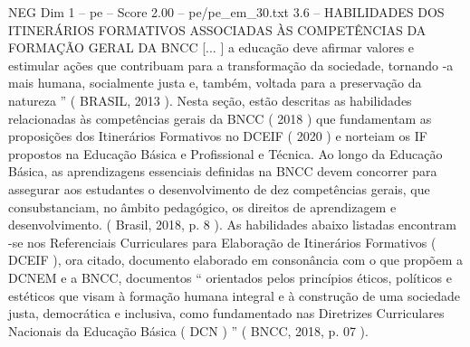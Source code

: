 \begin{textsample}{NEG Dim 1 – pe – Score 2.00 – pe/pe\_em\_30.txt}  \label{ex:f1_neg_043}
3.6 – HABILIDADES DOS ITINERÁRIOS FORMATIVOS ASSOCIADAS ÀS COMPETÊNCIAS DA FORMAÇÃO GERAL DA BNCC [... ] a educação deve afirmar valores e estimular ações que contribuam para a transformação da sociedade, tornando -a mais humana, socialmente justa e, também, voltada para a preservação da natureza ” ( BRASIL, 2013 ).
Nesta seção, estão descritas as habilidades relacionadas às competências gerais da BNCC ( 2018 ) que fundamentam as proposições dos Itinerários Formativos no DCEIF ( 2020 ) e norteiam os IF propostos na Educação Básica e Profissional e Técnica.
Ao longo da Educação Básica, as aprendizagens essenciais definidas na BNCC devem concorrer para assegurar aos estudantes o desenvolvimento de dez competências gerais, que consubstanciam, no âmbito pedagógico, os direitos de aprendizagem e desenvolvimento. ( Brasil, 2018, p. 8 ).
As habilidades abaixo listadas encontram -se nos Referenciais Curriculares para Elaboração de Itinerários Formativos ( DCEIF ), ora citado, documento elaborado em consonância com o que propõem a DCNEM e a BNCC, documentos “ orientados pelos princípios éticos, políticos e estéticos que visam à formação humana integral e à construção de uma sociedade justa, democrática e inclusiva, como fundamentado nas Diretrizes Curriculares Nacionais da Educação Básica ( DCN ) ” ( BNCC, 2018, p. 07 ).

\end{textsample}
